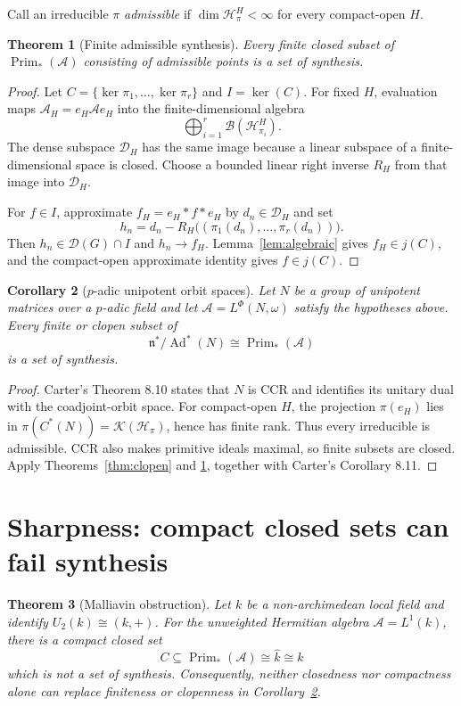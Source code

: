 \documentclass[11pt]{article}
\newtheorem{theorem}{Theorem}
\newtheorem{corollary}[theorem]{Corollary}
\newcommand{\A}{\mathcal A}
\newcommand{\D}{\mathcal D}
\newcommand{\Prim}{\operatorname{Prim}}
\newcommand{\Ad}{\operatorname{Ad}}
\begin{document}
Call an irreducible $\pi$ \emph{admissible} if
$\dim\mathcal H_\pi^H<\infty$ for every compact-open $H$.

\begin{theorem}[Finite admissible synthesis]\label{thm:finite}
Every finite closed subset of $\Prim_*(\A)$ consisting of admissible points
is a set of synthesis.
\end{theorem}

\begin{proof}
Let $C=\{\ker\pi_1,\ldots,\ker\pi_r\}$ and $I=\ker(C)$.  For fixed $H$,
evaluation maps $\A_H=e_H\A e_H$ into the finite-dimensional algebra
\[
 \bigoplus_{i=1}^r\mathcal B(\mathcal H_{\pi_i}^H).
\]
The dense subspace $\D_H$ has the same image because a linear subspace of a
finite-dimensional space is closed.  Choose a bounded linear right inverse
$R_H$ from that image into $\D_H$.

For $f\in I$, approximate $f_H=e_H*f*e_H$ by $d_n\in\D_H$ and set
\[
 h_n=d_n-R_H\bigl((\pi_1(d_n),\ldots,\pi_r(d_n))\bigr).
\]
Then $h_n\in\D(G)\cap I$ and $h_n\to f_H$.  Lemma~\ref{lem:algebraic}
gives $f_H\in j(C)$, and the compact-open approximate identity gives
$f\in j(C)$.
\end{proof}

\begin{corollary}[$p$-adic unipotent orbit spaces]\label{cor:padic}
Let $N$ be a group of unipotent matrices over a $p$-adic field and let
$\A=L^\Phi(N,\omega)$ satisfy the hypotheses above.  Every finite or clopen
subset of
\[
 \mathfrak n^*/\Ad^*(N)\cong\Prim_*(\A)
\]
is a set of synthesis.
\end{corollary}

\begin{proof}
Carter's Theorem 8.10 states that $N$ is CCR and identifies its unitary dual
with the coadjoint-orbit space.  For compact-open $H$, the projection
$\pi(e_H)$ lies in $\pi(C^*(N))=\mathcal K(\mathcal H_\pi)$, hence has finite
rank.  Thus every irreducible is admissible.  CCR also makes primitive ideals
maximal, so finite subsets are closed.  Apply Theorems~\ref{thm:clopen} and
\ref{thm:finite}, together with Carter's Corollary 8.11.
\end{proof}

\section{Sharpness: compact closed sets can fail synthesis}

\begin{theorem}[Malliavin obstruction]\label{thm:malliavin}
Let $k$ be a non-archimedean local field and identify
$U_2(k)\cong(k,+)$.  For the unweighted Hermitian algebra
$\A=L^1(k)$, there is a compact closed set
\[
 C\subseteq \Prim_*(\A)\cong\widehat{k}\cong k
\]
which is not a set of synthesis.  Consequently, neither closedness nor
compactness alone can replace finiteness or clopenness in
Corollary~\ref{cor:padic}.
\end{theorem}
\end{document}
